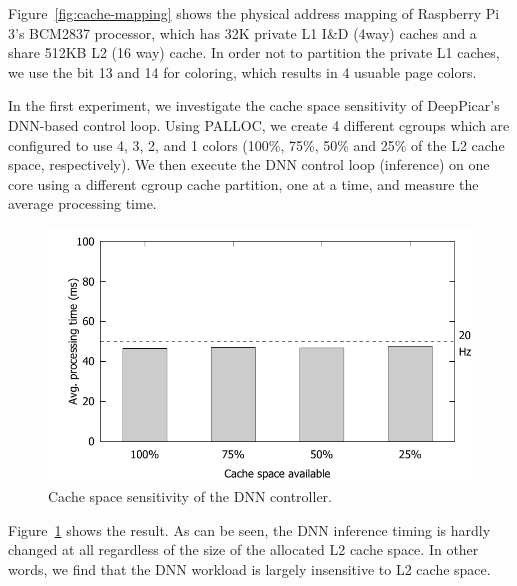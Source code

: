 Figure~\ref{fig:cache-mapping} shows the physical address
mapping of Raspberry Pi 3's BCM2837 processor, which has 32K private
L1 I\&D (4way) caches and a share 512KB L2 (16 way) cache. In order not
to partition the private L1 caches, we use the bit 13 and 14 for
coloring, which results in 4 usuable page colors.



In the first experiment, we investigate the cache space sensitivity of
DeepPicar's DNN-based control loop. Using PALLOC, we create 4
different cgroups which are configured to use 4, 3,
2, and 1 colors (100\%, 75\%, 50\% and 25\% of the L2 cache
space, respectively). We then execute the DNN control loop (inference)
on one core using a different cgroup cache partition, one at a time,
and measure the average processing time.

\begin{figure}[h]
  \centering
  \includegraphics[width=.45\textwidth]{figs/palloc_multicore}
  \caption{Cache space sensitivity of the DNN controller.}
  \label{fig:palloc_multicore}
\end{figure}

Figure~\ref{fig:palloc_multicore} shows the result. As can be seen,
the DNN inference timing is hardly changed at all regardless of the
size of the allocated L2 cache space. In other words, we find that
the DNN workload is largely insensitive to L2 cache space.

